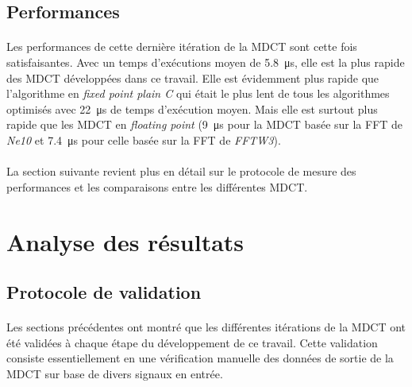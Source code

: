 \documentclass{article}
\begin{document}
    \subsection{Performances}
    \paragraph{}
    Les performances de cette dernière itération de la MDCT sont cette fois satisfaisantes. Avec un temps d'exécutions moyen de \SI{5.8}{\micro\second}, elle est la plus rapide des MDCT développées dans ce travail. Elle est évidemment plus rapide que l'algorithme en \emph{fixed point plain C} qui était le plus lent de tous les algorithmes optimisés avec \SI{22}{\micro\second} de temps d'exécution moyen. Mais elle est surtout plus rapide que les MDCT en \emph{floating point} (\SI{9}{\micro\second} pour la MDCT basée sur la FFT de \emph{Ne10} et \SI{7.4}{\micro\second} pour celle basée sur la FFT de \emph{FFTW3}).

    \paragraph{}
    La section suivante revient plus en détail sur le protocole de mesure des performances et les comparaisons entre les différentes MDCT.


    \newpage
    \section{Analyse des résultats}
    \subsection{Protocole de validation}
    \label{sec:validation}




    \paragraph{}
    Les sections précédentes ont montré que les différentes itérations de la MDCT ont été validées à chaque étape du développement de ce travail. Cette validation consiste essentiellement en une vérification manuelle des données de sortie de la MDCT sur base de divers signaux en entrée.
\end{document}
